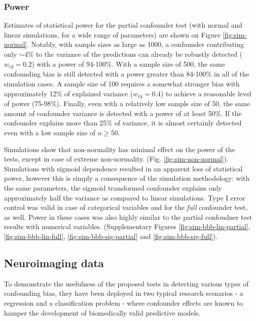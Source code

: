 \documentclass{article}
\begin{document}
\subsubsection*{Power}

Estimates of statistical power for the partial confounder test (with normal and linear simulations, for  a wide range of parameters) are shown on Figure \ref{fig:sim-normal}. Notably, with sample sizes as large as 1000, a confounder contributing only $\sim 4\%$ to the variance of the predictions can already be robustly detected ($w_{c\hat{y}} = 0.2$) with a power of 94-100\%. With a sample size of 500, the same confounding bias is still detected with a power greater than 84-100\% in all of the simulation cases. A sample size of 100 requires a somewhat stronger bias with approximately 12\% of explained variance ($w_{c\hat{y}}=0.4$) to achieve a reasonable level of power (75-98\%). Finally, even with a relatively low sample size of 50, the same amount of confounder variance is detected with a power of at least 50\%. If the confounder explains more than 25\% of variance, it is almost certainly detected even with a low sample size of $n \geq 50$.

Simulations show that non-normality has minimal effect on the power of the tests, except in case of extreme non-normality. (Fig. \ref{fig:sim-non-normal}). Simulations with sigmoid dependence resulted in an apparent loss of statistical power, however this is simply a consequence of the simulation methodology: with the same parameters, the sigmoid transformed confounder explains only approximately half the variance as compared to linear simulations.
Type I error control was valid in case of categorical variables and for the \emph{full} confounder test, as well. Power in these cases was also highly similar to the partial confoudner test results with numerical variables. (Supplementary Figures \ref{fig:sim-bbb-lin-partial}, \ref{fig:sim-bbb-lin-full}, \ref{fig:sim-bbb-sig-partial} and \ref{fig:sim-bbb-sig-full}).


\subsection{Neuroimaging data}

To demonstrate the usefulness of the proposed tests in detecting various types of confounding bias, they have been deployed in two typical research scenarios - a regression and a classification problem - where confounder effects are known to hamper the development of biomedically valid predictive models. 
\end{document}
